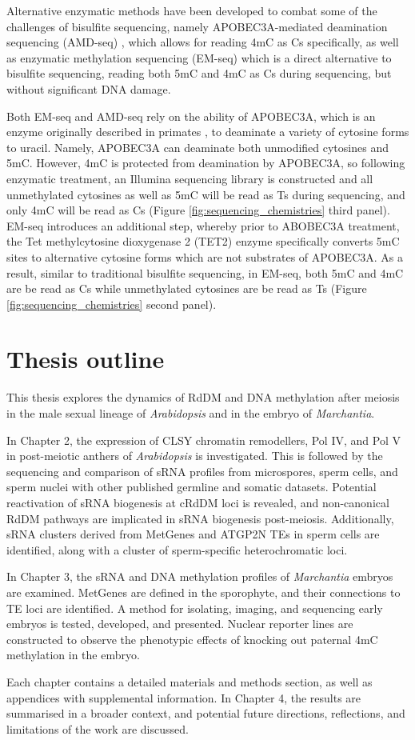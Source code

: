 Alternative enzymatic methods have been developed to combat some of the challenges of bisulfite sequencing, namely APOBEC3A-mediated deamination sequencing (AMD-seq) \cite{RN188}, which allows for reading 4mC as Cs specifically, as well as enzymatic methylation sequencing \cite{RN319} (EM-seq) which is a direct alternative to bisulfite sequencing, reading both 5mC and 4mC as Cs during sequencing, but without significant DNA damage.

Both EM-seq and AMD-seq rely on the ability of APOBEC3A, which is an enzyme originally described in primates \cite{RN320}, to deaminate a variety of cytosine forms to uracil. Namely, APOBEC3A can deaminate both unmodified cytosines and 5mC. However, 4mC is protected from deamination by APOBEC3A, so following enzymatic treatment, an Illumina sequencing library is constructed and all unmethylated cytosines as well as 5mC will be read as Ts during sequencing, and only 4mC will be read as Cs \cite{RN188} (Figure \ref{fig:sequencing_chemistries} third panel). EM-seq introduces an additional step, whereby prior to ABOBEC3A treatment, the Tet methylcytosine dioxygenase 2 (TET2) enzyme specifically converts 5mC sites to alternative cytosine forms which are not substrates of APOBEC3A. As a result, similar to traditional bisulfite sequencing, in EM-seq, both 5mC and 4mC are be read as Cs while unmethylated cytosines are be read as Ts (Figure \ref{fig:sequencing_chemistries} second panel).

\section{Thesis outline}

This thesis explores the dynamics of RdDM and DNA methylation after meiosis in the male sexual lineage of \textit{Arabidopsis} and in the embryo of \textit{Marchantia}.

In Chapter 2, the expression of CLSY chromatin remodellers, Pol IV, and Pol V in post-meiotic anthers of \textit{Arabidopsis} is investigated. This is followed by the sequencing and comparison of sRNA profiles from microspores, sperm cells, and sperm nuclei with other published germline and somatic datasets. Potential reactivation of sRNA biogenesis at cRdDM loci is revealed, and non-canonical RdDM pathways are implicated in sRNA biogenesis post-meiosis. Additionally, sRNA clusters derived from MetGenes and ATGP2N TEs in sperm cells are identified, along with a cluster of sperm-specific heterochromatic loci.

In Chapter 3, the sRNA and DNA methylation profiles of \textit{Marchantia} embryos are examined. MetGenes are defined in the sporophyte, and their connections to TE loci are identified. A method for isolating, imaging, and sequencing early embryos is tested, developed, and presented. Nuclear reporter lines are constructed to observe the phenotypic effects of knocking out paternal 4mC methylation in the embryo.

Each chapter contains a detailed materials and methods section, as well as appendices with supplemental information. In Chapter 4, the results are summarised in a broader context, and potential future directions, reflections, and limitations of the work are discussed.